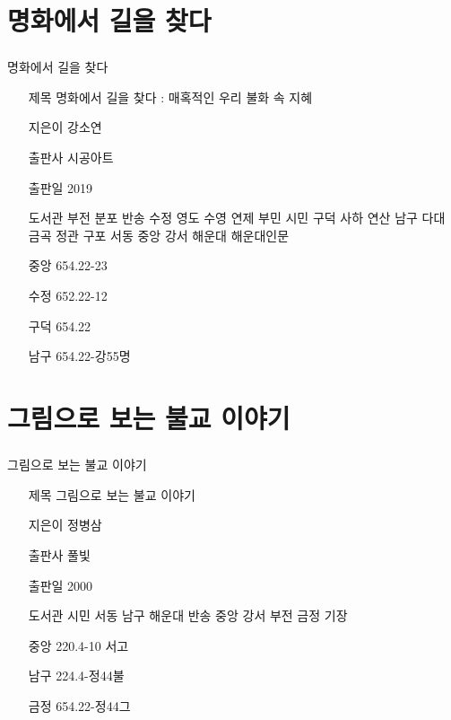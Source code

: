 \documentclass[aspectratio=1610,14pt,xcolor=pdftex,dvipsnames,table,handout]{beamer}
\begin{document}
		\section{ 명화에서 길을 찾다 }
		\begin{frame} [t,plain]
		\frametitle{}
			\begin{block} { 명화에서 길을 찾다 }
			\setlength{\leftmargini}{4em}			
			\begin{itemize}
				\item [제목]  	명화에서 길을 찾다 : 매혹적인 우리 불화 속 지혜
				\item [지은이]	강소연
				\item [출판사]	시공아트	
				\item [출판일]	2019

				\item [도서관]	부전 분포 반송 수정 영도 수영 연제 부민 시민 구덕 사하 연산 남구 다대 금곡 정관 구포 서동 중앙 강서 해운대 해운대인문

				\item [중앙]		654.22-23
				\item [수정]		652.22-12
				\item [구덕]		654.22
				\item [남구]		654.22-강55명 
			\end{itemize}
			\end{block}						

		\end{frame}						
		


		\section{ 그림으로 보는 불교 이야기 }
		\begin{frame} [t,plain]
		\frametitle{}
			\begin{block} { 그림으로 보는 불교 이야기 }
			\setlength{\leftmargini}{5em}			
			\begin{itemize}
				\item [제목]  	그림으로 보는 불교 이야기 
				\item [지은이]	정병삼
				\item [출판사]	풀빛
				\item [출판일]	2000

				\item [도서관]	시민 서동 남구 해운대 반송 중앙 강서 부전 금정 기장 

				\item [중앙]		220.4-10 서고
				\item [남구]		224.4-정44불
				\item [금정]		654.22-정44그
			\end{itemize}
			\end{block}			

								
		\end{frame}						
			
\end{document}
